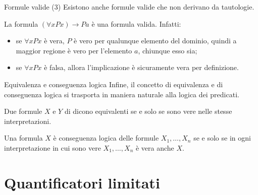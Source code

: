 \documentclass[aspectratio=169,10pt,dvipsnames,xcolor=table,handout]{beamer}
\begin{document}
\begin{frame}{Formule valide (3)}
    Esistono anche formule valide che non derivano da tautologie.
    \begin{example}
        La formula $(\forall x Px) \to Pa$ è una formula valida. Infatti:
        \begin{itemize}
            \item se $\forall x Px$ è vera, $P$ è vero per qualunque elemento del dominio, quindi a maggior regione è vero per l'elemento $a$, chiunque esso sia;
            \item se $\forall x Px$ è falsa, allora l'implicazione è sicuramente vera per definizione.
        \end{itemize}
    \end{example}
\end{frame}


\begin{frame}{Equivalenza e conseguenza logica}
    Infine, il concetto di equivalenza e di conseguenza logica si trasporta in maniera naturale alla logica dei predicati.
    \begin{definition}
        Due formule $X$ e $Y$ di dicono \alert{equivalenti} se e solo se sono vere nelle stesse interpretazioni.
    \end{definition}

    \begin{definition}
        Una formula $X$ è \alert{conseguenza logica} delle formule $X_1, \ldots, X_n$ se e solo se in ogni interpretazione in cui sono vere $X_1, \ldots, X_n$ è vera anche $X$.
    \end{definition}
\end{frame}

\section{Quantificatori limitati}
\end{document}
